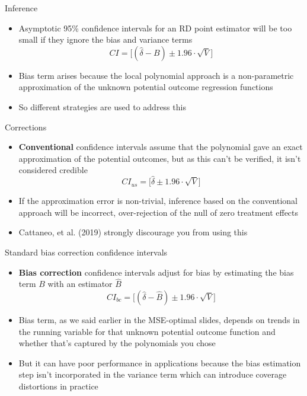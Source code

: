 \documentclass{beamer}
\begin{document}
\begin{frame}{Inference}

\begin{itemize}
\item Asymptotic 95\% confidence intervals for an RD point estimator will be too small if they ignore the bias and variance terms$$CI=\bigg [ ( \widehat{\delta} - B) \pm 1.96 \cdot \sqrt{V} \bigg ]$$
\item Bias term arises because the local polynomial approach is a non-parametric approximation of the unknown potential outcome regression functions
\item So different strategies are used to address this 
\end{itemize}

\end{frame}

\begin{frame}{Corrections}
\begin{itemize}
\item \textbf{Conventional} confidence intervals assume that the polynomial gave an exact approximation of the potential outcomes, but as this can't be verified, it isn't considered credible $$CI_{us}=\bigg [ \widehat{\delta}  \pm 1.96 \cdot \sqrt{V} \bigg ]$$
\item If the approximation error is non-trivial, inference based on the conventional approach will be incorrect, over-rejection of the null of zero treatment effects
\item Cattaneo, et al. (2019) strongly discourage you from using this
\end{itemize}

\end{frame}


\begin{frame}{Standard bias correction confidence intervals}

\begin{itemize}
\item \textbf{Bias correction} confidence intervals adjust for bias by estimating the bias term $B$ with an estimator $\widehat{B}$  $$CI_{bc}=\bigg [ ( \widehat{\delta} - \widehat{B} ) \pm 1.96 \cdot \sqrt{V} \bigg ]$$
\item Bias term, as we said earlier in the MSE-optimal slides, depends on trends in the running variable for that unknown potential outcome function and whether that's captured by the polynomials you chose
\item But it can have poor performance in applications because the bias estimation step isn't incorporated in the variance term which can introduce coverage distortions in practice
\end{itemize}

\end{frame}
\end{document}
